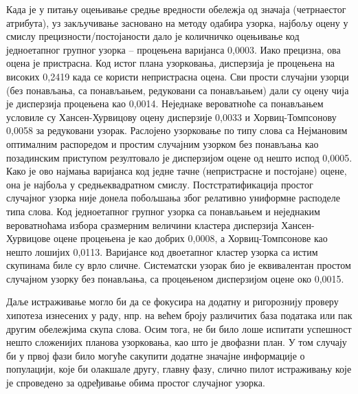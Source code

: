 \documentclass[a4paper]{article}
\begin{document}
Када је у питању оцењивање средње вредности обележја од значаја (четрнаестог атрибута), уз закључивање засновано на методу одабира узорка, најбољу оцену у смислу прецизности/постојаности дало је количничко оцењивање код једноетапног групног узорка -- процењена варијанса 0,0003. Иако прецизна, ова оцена је пристрасна. Код истог плана узорковања, дисперзија је процењена на високих 0,2419 када се користи непристрасна оцена. Сви прости случајни узорци (без понављања, са понављањем, редуковани са понављањем) дали су оцену чија је дисперзија процењена као 0,0014. Неједнаке вероватноће са понављањем условиле су Хансен-Хурвицову оцену дисперзије 0,0033 и Хорвиц-Томпсонову 0,0058 за редуковани узорак. Раслојено узорковање по типу слова са Нејмановим оптималним распоредом и простим случајним узорком без понављања као позадинским приступом резултовало је дисперзијом оцене од нешто испод 0,0005. Како је ово најмања варијанса код једне тачне (непристрасне и постојане) оцене, она је најбоља у средњеквадратном смислу. Постстратификација простог случајног узорка није донела побољшања због релативно униформне расподеле типа слова. Код једноетапног групног узорка са понављањем и неједнаким вероватноћама избора сразмерним величини кластера дисперзија Хансен-Хурвицове оцене процењена је као добрих 0,0008, а Хорвиц-Томпсонове као нешто лошијих 0,0113. Варијансе код двоетапног кластер узорка са истим скупинама биле су врло сличне. Систематски узорак био је еквивалентан простом случајном узорку без понављања, са процењеном дисперзијом оцене око 0,0015.

Даље истраживање могло би да се фокусира на додатну и ригорознију проверу хипотеза изнесених у раду, нпр. на већем броју различитих база података или пак другим обележјима скупа слова. Осим тога, не би било лоше испитати успешност нешто сложенијих планова узорковања, као што је двофазни план. У том случају би у првој фази било могуће сакупити додатне значајне информације о популацији, које би олакшале другу, главну фазу, слично пилот истраживању које је спроведено за одређивање обима простог случајног узорка.

\newpage
{}
\appendix


\end{document}
